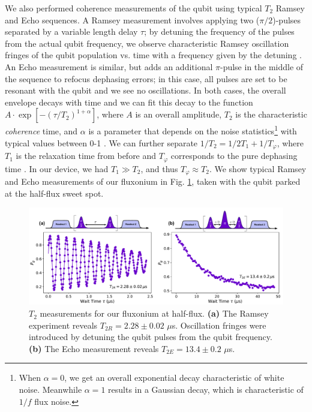 We also performed coherence measurements of the qubit using typical $T_2$ Ramsey and Echo sequences. A Ramsey measurement involves applying two ($\pi/2$)-pulses separated by a variable length delay $\tau$; by detuning the frequency of the pulses from the actual qubit frequency, we observe characteristic Ramsey oscillation fringes of the qubit population vs. time with a frequency given by the detuning \cite{raimond2006exploring, krantz2019quantum, naghiloo2019introduction}. An Echo measurement is similar, but adds an additional $\pi$-pulse in the middle of the sequence to refocus dephasing errors; in this case, all pulses are set to be resonant with the qubit and we see no oscillations. In both cases, the overall envelope decays with time and we can fit this decay to the function $A\cdot\exp[-(\tau/T_2)^{1 +\alpha}]$, where $A$ is an overall amplitude, $T_2$ is the characteristic \textit{coherence} time, and $\alpha$ is a parameter that depends on the noise statistics\footnote{When $\alpha = 0$, we get an overall exponential decay characteristic of white noise. Meanwhile $\alpha=1$ results in a Gaussian decay, which is characteristic of $1/f$ flux noise.} with typical values between 0-1 \cite{ithier2005decoherence, hutchings2017tunable, didier2019ac}. We can further separate $1/T_2 = 1/2T_1 + 1/T_\varphi$, where $T_1$ is the relaxation time from before and $T_\varphi$ corresponds to the pure dephasing time \cite{krantz2019quantum}. In our device, we had $T_1 \gg T_2$, and thus $T_\varphi \approx T_2$. We show typical Ramsey and Echo  measurements of our fluxonium in Fig. \ref{fig:4_T2_ramsey_echo}, taken with the qubit parked at the half-flux sweet spot. 
\begin{figure}[h]
    \centering
    \includegraphics[width=0.95\linewidth]{Figures/4/T2_ramsey_echo.pdf}
    \caption[Qubit \texorpdfstring{$T_2$}{T2} Ramsey and Echo measurements.]{$T_2$ measurements for our fluxonium at half-flux. \textbf{(a)} The Ramsey experiment reveals $T_{2R} = 2.28 \pm 0.02$ $\mu$s. Oscillation fringes were introduced by detuning the qubit pulses from the qubit frequency. \textbf{(b)} The Echo measurement reveals $T_{2E} = 13.4 \pm 0.2$ $\mu$s. }
    \label{fig:4_T2_ramsey_echo}
\end{figure}

